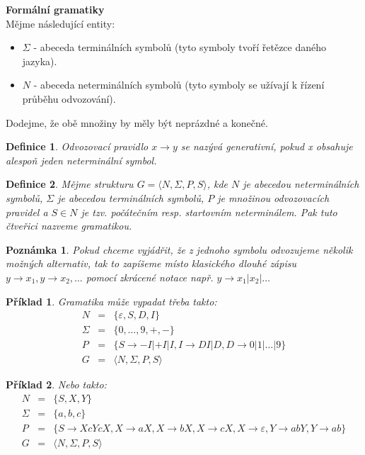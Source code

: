 \documentclass[10pt,a4paper]{article}
\theoremstyle{note}
\newtheorem{definice}{Definice}
\newtheorem{priklad}{Příklad}
\newtheorem{poznamka}{Poznámka}
\begin{document}
\textbf{Formální gramatiky}\\

		\vspace{3mm}
Mějme následující entity:
\begin{itemize}
\item $\Sigma$ - abeceda terminálních symbolů (tyto symboly tvoří řetězce daného jazyka).
\item $N$ - abeceda neterminálních symbolů (tyto symboly se užívají k řízení průběhu odvozování).
\end{itemize}

Dodejme, že obě množiny by měly být neprázdné a konečné.

\begin{definice}
Odvozovací pravidlo $x \rightarrow y$ se nazývá \textit{generativní}, pokud \textit{x} obsahuje alespoň jeden neterminální symbol.
\end{definice}

\begin{definice}
Mějme strukturu $G = \langle N, \Sigma, P, S \rangle$, kde $N$ je abecedou neterminálních symbolů, $\Sigma$ je abecedou terminálních symbolů,
$P$ je množinou odvozovacích pravidel a $S \in N$ je tzv. \textit{počátečním} resp. \textit{startovním} neterminálem. Pak tuto čtveřici nazveme \textit{gramatikou}.
\end{definice}

\begin{poznamka}
Pokud chceme vyjádřit, že z jednoho symbolu odvozujeme několik možných alternativ, tak to zapíšeme místo klasického dlouhé zápisu
$y \rightarrow x_{1}, y \rightarrow x_{2}, \ldots$ pomocí zkrácené notace např. $y \rightarrow x_{1}|x_{2}|\ldots$
\end{poznamka}

\begin{priklad}
Gramatika může vypadat třeba takto:
\begin{eqnarray*}
N &=& \lbrace \varepsilon, S, D, I \rbrace \\
\Sigma &=& \lbrace 0, \ldots, 9, +, - \rbrace \\
P &=& \lbrace S \rightarrow -I|+I|I, I \rightarrow DI|D, D \rightarrow 0|1|\ldots |9 \rbrace \\
G &=& \langle N, \Sigma, P, S \rangle
\end{eqnarray*}
\end{priklad}

\begin{priklad}\label{priklad-2}
Nebo takto:
\begin{eqnarray*}
N &=& \lbrace S, X, Y \rbrace \\
\Sigma &=& \lbrace a, b, c \rbrace \\
P &=& \lbrace S \rightarrow XcYcX, X \rightarrow aX, X \rightarrow bX, X \rightarrow cX, X \rightarrow \varepsilon,
Y \rightarrow abY, Y \rightarrow ab \rbrace \\
G &=& \langle N, \Sigma, P, S \rangle
\end{eqnarray*}
\end{priklad}
\end{document}

